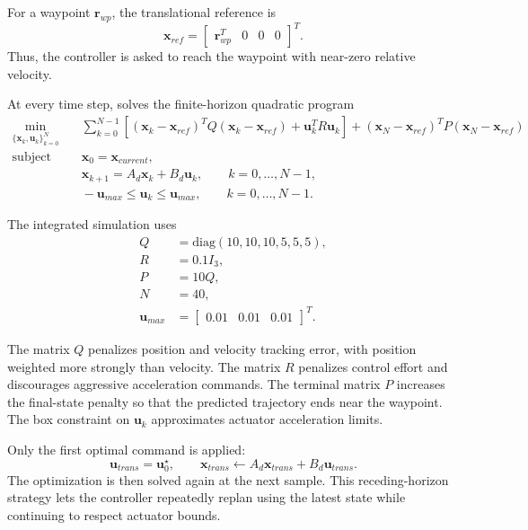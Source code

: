 \documentclass[11pt]{article}
\begin{document}
For a waypoint \(\bm{r}_{wp}\), the translational reference is
\begin{equation}
    \bm{x}_{ref}
    =
    \begin{bmatrix}
    \bm{r}_{wp}^{T} & 0 & 0 & 0
    \end{bmatrix}^{T}.
\end{equation}
Thus, the controller is asked to reach the waypoint with near-zero relative velocity.

At every time step,  solves the finite-horizon quadratic program
\begin{align}
\min_{\{\bm{x}_k,\bm{u}_k\}_{k=0}^{N}}
&\quad
\sum_{k=0}^{N-1}
\left[
(\bm{x}_k-\bm{x}_{ref})^{T}Q(\bm{x}_k-\bm{x}_{ref})
+
\bm{u}_k^{T}R\bm{u}_k
\right]
+
(\bm{x}_N-\bm{x}_{ref})^{T}P(\bm{x}_N-\bm{x}_{ref})
\label{eq:mpc_cost}\\
\text{subject to}
&\quad
\bm{x}_0 = \bm{x}_{current}, \nonumber\\
&\quad
\bm{x}_{k+1} = A_d\bm{x}_k + B_d\bm{u}_k,
\qquad k=0,\ldots,N-1, \nonumber\\
&\quad
-\bm{u}_{max} \leq \bm{u}_k \leq \bm{u}_{max},
\qquad k=0,\ldots,N-1. \nonumber
\end{align}

The integrated simulation uses
\begin{align}
Q &= \mathrm{diag}(10,10,10,5,5,5),\\
R &= 0.1 I_3,\\
P &= 10Q,\\
N &= 40,\\
\bm{u}_{max} &= \begin{bmatrix}0.01 & 0.01 & 0.01\end{bmatrix}^{T}.
\end{align}

The matrix \(Q\) penalizes position and velocity tracking error, with position weighted more strongly than velocity. The matrix \(R\) penalizes control effort and discourages aggressive acceleration commands. The terminal matrix \(P\) increases the final-state penalty so that the predicted trajectory ends near the waypoint. The box constraint on \(\bm{u}_k\) approximates actuator acceleration limits.

Only the first optimal command is applied:
\begin{equation}
    \bm{u}_{trans} = \bm{u}_0^{\star},
    \qquad
    \bm{x}_{trans} \leftarrow A_d\bm{x}_{trans} + B_d\bm{u}_{trans}.
\end{equation}
The optimization is then solved again at the next sample. This receding-horizon strategy lets the controller repeatedly replan using the latest state while continuing to respect actuator bounds.
\end{document}
